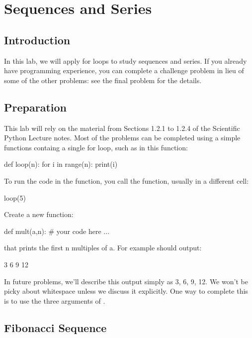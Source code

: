 \chapter{Sequences and Series}

\section{Introduction}

In this lab, we will apply for loops to study sequences and series.
If you already have programming experience, you can complete a
challenge problem in lieu of some of the other problems: see the final
problem for the details.

\section{Preparation}

This lab will rely on the material from Sections 1.2.1 to 1.2.4 of the
Scientific Python Lecture notes.  Most of the problems can be
completed using a simple functions containg a single for loop, such as
in this function:
\begin{python}
  def loop(n):
    for i in range(n):
        print(i)
\end{python}
To run the code in the function, you call the function, usually in a different cell:
\begin{python}
loop(5)
\end{python}

\vskip 0.25cm
\plot Create a new function:
\begin{python}
def mult(a,n):
   # your code here ...
\end{python}
that prints the first n multiples of a.  For example  should output:
\begin{python}
3
6
9
12
\end{python}
In future problems, we'll describe this output simply as 3, 6, 9, 12.
We won't be picky about whitespace unless we discuss it explicitly.
One way to complete this is to use the three arguments of
.

\section{Fibonacci Sequence}

